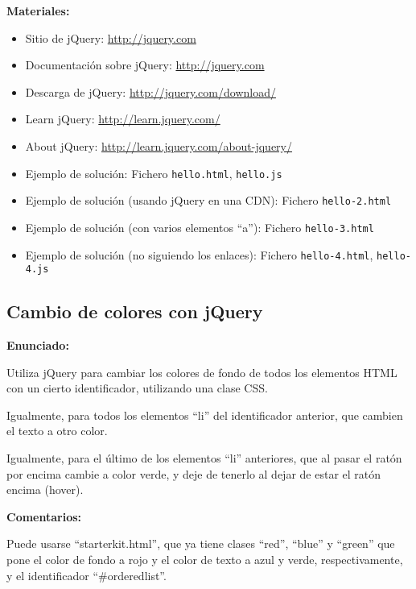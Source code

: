 \textbf{Materiales:}

\begin{itemize}
\item Sitio de jQuery: \url{http://jquery.com}
\item Documentación sobre jQuery: \url{http://jquery.com}
\item Descarga de jQuery: \url{http://jquery.com/download/}
\item Learn jQuery: \url{http://learn.jquery.com/}
\item About jQuery: \url{http://learn.jquery.com/about-jquery/}
\item Ejemplo de solución: Fichero \verb|hello.html|, \verb|hello.js|
\item Ejemplo de solución (usando jQuery en una CDN):
  Fichero \verb|hello-2.html|
\item Ejemplo de solución (con varios elementos ``a''):
  Fichero \verb|hello-3.html|
\item Ejemplo de solución (no siguiendo los enlaces):
  Fichero \verb|hello-4.html|, \verb|hello-4.js|
\end{itemize}



\subsection{Cambio de colores con jQuery}
\label{subsec:eje-jquery-colores}

\textbf{Enunciado:}

Utiliza jQuery para cambiar los colores de fondo de todos los elementos HTML con un cierto identificador, utilizando una clase CSS.

Igualmente, para todos los elementos ``li'' del identificador anterior, que cambien el texto a otro color.

Igualmente, para el último de los elementos ``li'' anteriores, que al pasar el ratón por encima cambie a color verde, y deje de tenerlo al dejar de estar el ratón encima (hover).

\textbf{Comentarios:}

Puede usarse ``starterkit.html'', que ya tiene clases ``red'', ``blue'' y ``green'' que pone el color de fondo a rojo y el color de texto a azul y verde, respectivamente, y el identificador ``\#orderedlist''.

